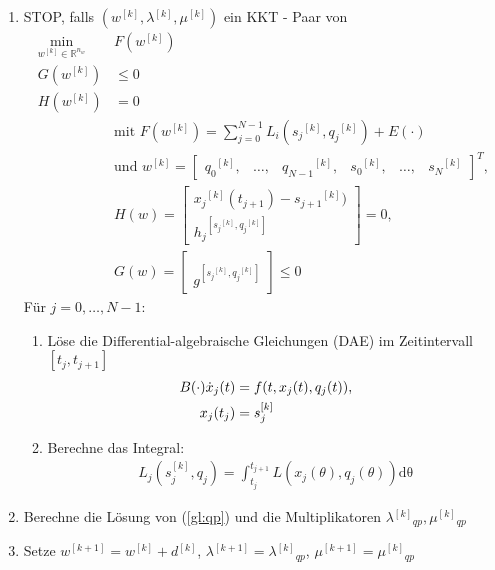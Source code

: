 \documentclass[a4paper,oneside,DIV8,10pt]{scrartcl}
\newcounter{alg}
\newcommand{\R}{\ensuremath{\mathbb{R}}}   %
\newcommand{\hN}[1]{\ensuremath{^{[#1]}}}
\theoremstyle{definition}
\begin{document}
  \begin{enumerate}[(1)]
    \setcounter{enumi}{\value{alg}}
    \item STOP, falls $(w\hN{k}, \lambda\hN{k}, \mu\hN{k})$ ein KKT - Paar von 
          \begin{align*}
            \min_{w\hN{k} \in \R^{n_w}} &F(w\hN{k})\\
            G(w\hN{k}) &\leq 0 \\
            H(w\hN{k}) &= 0\\
            &\text{mit } F(w\hN{k}) = \sum_{j=0}^{N-1} L_i(s_j\hN{k}, q_j\hN{k}) + E(\cdot)  \\
            &\text{und } w\hN{k} = \left[\begin{matrix} q_0\hN{k}, & \hdots, & q_{N-1}\hN{k}, & s_0\hN{k}, & \hdots, & s_N\hN{k} \end{matrix} \right]^T, \\
            &H(w) = \left[\begin{matrix} x_j\hN{k}(t_{j+1}) - s_{j+1}\hN{k}) \\ 
                                         h_j\hN{s_j\hN{k}, q_j\hN{k}}
                          \end{matrix}
                    \right] = 0,\\
            &G(w) = \left[\begin{matrix}  \\ 
                                         g\hN{s_j\hN{k}, q_j\hN{k}}
                          \end{matrix}
                    \right] \leq 0
          \end{align*}
    \setcounter{alg}{\value{enumi}}
    \hspace{-0.65cm} Für $j = 0, \hdots, N-1:$ 
    \begin{enumerate}[(3.1)]
      \item Löse die Differential-algebraische Gleichungen (DAE) im Zeitintervall $[t_j, t_{j+1}]$
          \begin{align}
            B(\cdot) \dot x_j(t) &= f(t, x_j(t), q_j(t)), \hspace{5mm} \nonumber \\
            x_j(t_j) &= s_j^{[k]} \nonumber
          \end{align}
      \item
        Berechne das Integral:
        \begin{eqnarray}
          L_j(s^{[k]}_j, q_j) = \int_{t_{j}}^{t_{j+1}} L(x_j(\theta), q_j(\theta)) \mathrm{d\theta} \nonumber
        \end{eqnarray}
    \end{enumerate}
    \item Berechne die Lösung von (\ref{gl:qp}) und die Multiplikatoren $\lambda\hN{k}_{qp}, \mu\hN{k}_{qp}$
    \item Setze $w\hN{k+1} = w\hN{k} + d\hN{k}$, $\lambda\hN{k+1} = \lambda\hN{k}_{qp}$, $\mu\hN{k+1} = \mu\hN{k}_{qp}$
  \end{enumerate}
  



\end{document}

